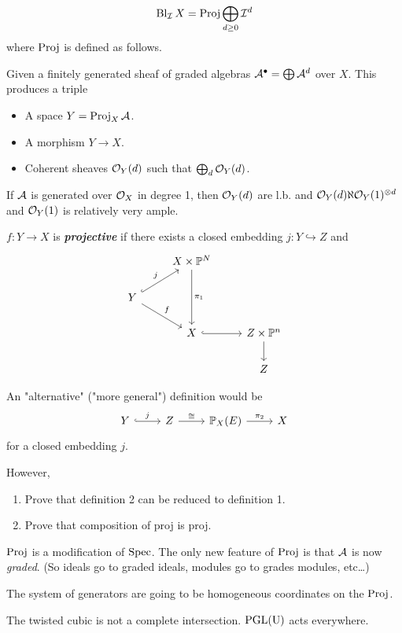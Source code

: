 \begin{defn}
	\[\operatorname{Bl}_{\mathcal{I}}X=\operatorname{Proj}\bigoplus_{d\geq0}\mathcal{I}^d\]
	where $\operatorname{Proj}$ is defined as follows.
\end{defn}
\begin{defn}[1]
	Given a finitely generated sheaf of graded algebras $\mathcal{A}^\bullet=\bigoplus\mathcal{A}^d$ over $X$. This produces a triple
	\begin{itemize}
		\item A space $Y=\operatorname{Proj}_X\mathcal{A}$.
		\item A morphism $Y\to X$.
		\item Coherent sheaves $\mathcal{O}_Y(d)$ such that $\bigoplus_d\mathcal{O}_Y(d)$.
	\end{itemize}
	If $\mathcal{A}$ is generated over $\mathcal{O}_X$ in degree 1, then $\mathcal{O}_Y(d)$ are l.b. and $\mathcal{O}_Y(d)\aleph\mathcal{O}_Y(1)^{\otimes d}$ and $\mathcal{O}_Y(1)$ is relatively very ample.
	
	$f:Y\to X$ is \textbf{\textit{projective}} if there exists a closed embedding $j:Y\hookrightarrow Z$ and
	\[\begin{tikzcd}
		&X\times\P^N\arrow[dd,"\pi_1"]\\
		Y\arrow[ur,hook,"j"]\arrow[dr,"f"]&\\
		&X\arrow[r,hook]&Z\times \P^n\arrow[d]\\
		&&Z
	\end{tikzcd}\]
\end{defn}
\begin{defn}[2]
	An "alternative" ("more general") definition would be
	\[\begin{tikzcd}
		Y\arrow[r,hook,"j"]&Z\arrow[r,"\cong"]&\P_X(E)\arrow[r,"\pi_2"]&X
	\end{tikzcd}\]
	for a closed embedding $j$.
\end{defn}
However,
\begin{exercise}\leavevmode
	\begin{enumerate}
		\item Prove that definition 2 can be reduced to definition 1.
		\item Prove that composition of proj is proj.
	\end{enumerate}
\end{exercise}
\begin{remark}
	$\operatorname{Proj}$ is a modification of $\operatorname{Spec}$. The only new feature of $\operatorname{Proj}$ is that $\mathcal{A}$ is now \textit{graded}. (So ideals go to graded ideals, modules go to grades modules, etc…)
\end{remark}
The system of generators are going to be homogeneous coordinates on the $\operatorname{Proj}$.
\begin{example}
	The twisted cubic is not a complete intersection. $\operatorname{PGL}(\operatorname{U})$ acts everywhere.
\end{example}
